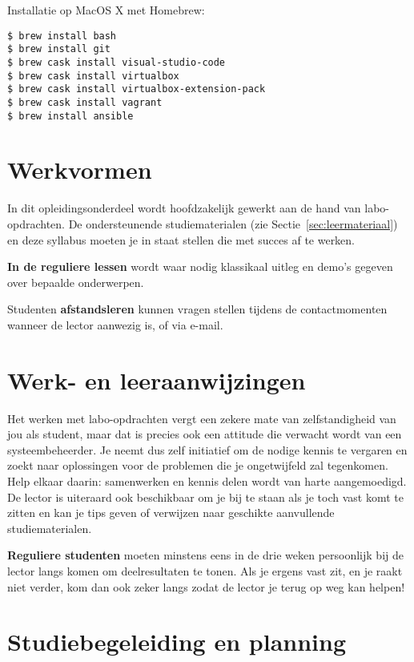 Installatie op MacOS X met Homebrew:

\begin{verbatim}
$ brew install bash
$ brew install git
$ brew cask install visual-studio-code
$ brew cask install virtualbox
$ brew cask install virtualbox-extension-pack
$ brew cask install vagrant
$ brew install ansible
\end{verbatim}

\section{Werkvormen}
\label{sec:werkvormen}

In dit opleidingsonderdeel wordt hoofdzakelijk gewerkt aan de hand van labo-op\-drach\-ten. De ondersteunende studiematerialen (zie Sectie~\ref{sec:leermateriaal}) en deze syllabus moeten je in staat stellen die met succes af te werken.

\textbf{In de reguliere lessen} wordt waar nodig klassikaal uitleg en demo's gegeven over bepaalde onderwerpen.

Studenten \textbf{afstandsleren} kunnen vragen stellen tijdens de contactmomenten wanneer de lector aanwezig is, of via e-mail.

\section{Werk- en leeraanwijzingen}
\label{sec:werk-en-leeraanwijzingen}

Het werken met labo-opdrachten vergt een zekere mate van zelfstandigheid van jou als student, maar dat is precies ook een attitude die verwacht wordt van een systeembeheerder. Je neemt dus zelf initiatief om de nodige kennis te vergaren en zoekt naar oplossingen voor de problemen die je ongetwijfeld zal tegenkomen. Help elkaar daarin: samenwerken en kennis delen wordt van harte aangemoedigd. De lector is uiteraard ook beschikbaar om je bij te staan als je toch vast komt te zitten en kan je tips geven of verwijzen naar geschikte aanvullende studiematerialen.

\textbf{Reguliere studenten} moeten minstens eens in de drie weken persoonlijk bij de lector langs komen om deelresultaten te tonen. Als je ergens vast zit, en je raakt niet verder, kom dan ook zeker langs zodat de lector je terug op weg kan helpen!

\section{Studiebegeleiding en planning}
\label{sec:studiebegeleiding-en-planning}

